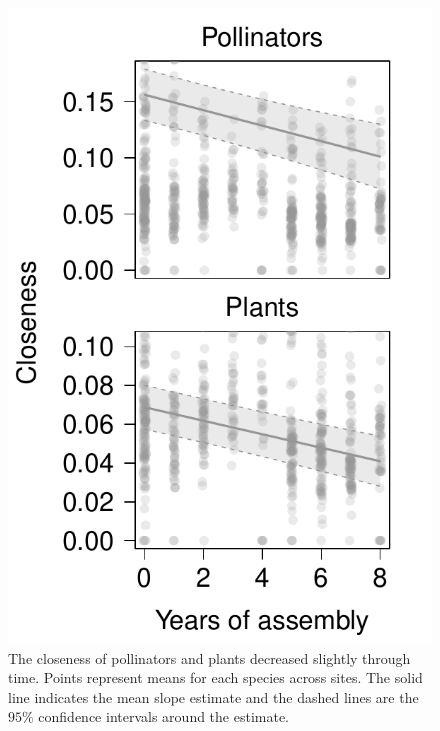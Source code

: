 \documentclass[12pt]{article}
\begin{document}
\begin{figure}
  \centering
  \includegraphics[width=.8\textwidth]{../analysis/speciesLevel/figures/closenessPanel.pdf}
  \caption{The closeness of pollinators and plants decreased slightly
    through time. Points represent means for each species across
    sites. The solid line indicates the mean slope estimate and the
    dashed lines are the $95\%$ confidence intervals around the
    estimate.}
  \label{fig:closeness}
\end{figure}
\clearpage
\end{document}
